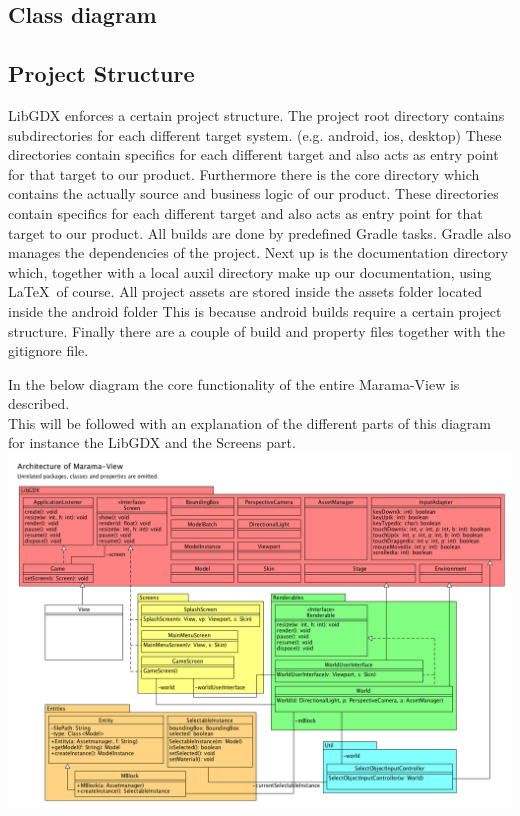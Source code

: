 \documentclass[10pt]{extarticle} %
\begin{document}
    \subsection[class_diagram]{Class diagram}

    \subsection{Project Structure}
    LibGDX enforces a certain project structure\cite{libgdxprojstruct}.
    The project root directory contains subdirectories for each different target system. (e.g. android, ios, desktop)
    These directories contain specifics for each different target and also acts as entry point for that target to our product.
    Furthermore there is the core directory which contains the actually source and business logic of our product.
    These directories contain specifics for each different target and also acts as entry point for that target to our product.
    All builds are done by predefined Gradle tasks.
    Gradle also manages the dependencies of the project.
    Next up is the documentation directory which, together with a local auxil directory make up our documentation, using \LaTeX\ of course.
    All project assets are stored inside the assets folder located inside the android folder
    This is because android builds require a certain project structure\cite{androidAssetLocation}.
    Finally there are a couple of build and property files together with the gitignore file.


    In the below diagram the core functionality of the entire Marama-View is described.\\
    This will be followed with an explanation of the different parts of this diagram for instance the LibGDX and the Screens part. \\
    \includegraphics[width=1\linewidth]{architecture-marama-view.png}
\end{document}
